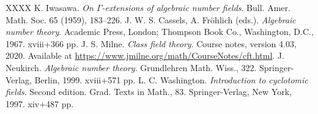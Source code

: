 \therefsection

\begin{thebibliography}{XXXX}
K. Iwasawa.
\emph{On $\Gamma$-extensions of algebraic number fields}.
Bull. Amer. Math. Soc. 65 (1959), 183--226.
J. W. S. Cassels, A. Fr\"ohlich (eds.).
\emph{Algebraic number theory}.
Academic Press, London; Thompson Book Co., Washington, D.C., 1967. xviii+366 pp.
J. S. Milne.
\emph{Class field theory}.
Course notes, version 4.03, 2020.
Available at \url{https://www.jmilne.org/math/CourseNotes/cft.html}.
J. Neukirch.
\emph{Algebraic number theory}.
Grundlehren Math. Wiss., 322.
Springer-Verlag, Berlin, 1999. xviii+571 pp.
L. C. Washington.
\emph{Introduction to cyclotomic fields}.
Second edition.
Grad. Texts in Math., 83.
Springer-Verlag, New York, 1997. xiv+487 pp.
\end{thebibliography}
